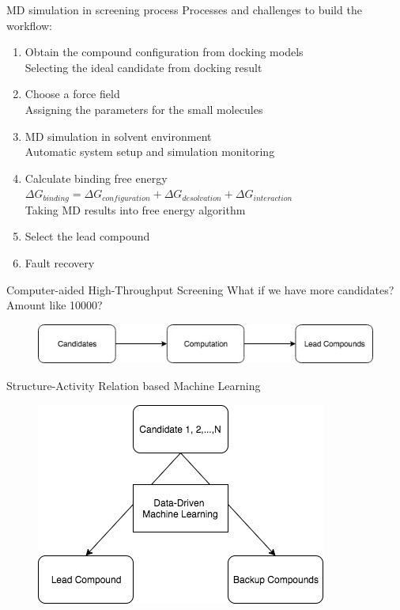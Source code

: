 \documentclass{beamer}
\begin{document}
\begin{frame}{MD simulation in screening process} 
Processes and challenges to build the workflow: 
\begin{enumerate}
	\item Obtain the compound configuration from docking models\\
	Selecting the ideal candidate from docking result
	\item Choose a force field \\
	Assigning the parameters for the small molecules 
	\item MD simulation in solvent environment \\
	Automatic system setup and simulation monitoring
	\item Calculate binding free energy\\
	$\Delta G_{binding} = \Delta G_{configuration} + \Delta G_{desolvation} + \Delta G_{interaction}$ \\
	Taking MD results into free energy algorithm
	\item Select the lead compound 
	\item Fault recovery	
\end{enumerate}
\end{frame}

\begin{frame}{Computer-aided High-Throughput Screening}
What if we have more candidates? Amount like 10000?
\begin{figure}
	\includegraphics[width=\linewidth]{Pics/DrugDis.jpg}
\end{figure}
\vspace{-.3cm}
Structure-Activity Relation based Machine Learning
\begin{figure}
	\includegraphics[width=.6\linewidth]{Pics/DecisionTree.jpg}
\end{figure}
\end{frame}
\end{document}
